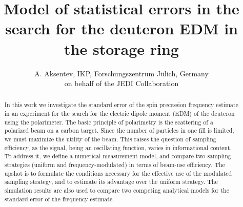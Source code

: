 \documentclass{article}
\begin{document}
	\title{Model of statistical errors in the search for the deuteron EDM in the storage ring}
	\author{A. Aksentev, IKP, Forschungszentrum J\"ulich, Germany\\ on behalf of the JEDI Collaboration}
	\date{}
	\maketitle

\begin{abstract}
In this work we investigate the standard error of the spin precession frequency estimate in an experiment for the search for the electric dipole moment (EDM) of the deuteron using the polarimeter. The basic principle of polarimetry is the scattering of a polarized beam on a carbon target. Since the number of particles in one fill is limited, we must maximize the utility of the beam. This raises the question of sampling efficiency, as the signal, being an oscillating function, varies in informational content. To address it, we define a numerical measurement model, and compare two sampling strategies (uniform and frequency-modulated) in terms of beam-use efficiency. The upshot is to formulate the conditions necessary for the effective use of the modulated sampling strategy, and to estimate its advantage over the uniform strategy. The simulation results are also used to compare two competing analytical models for the standard error of the frequency estimate.
\end{abstract}
	
\end{document}
